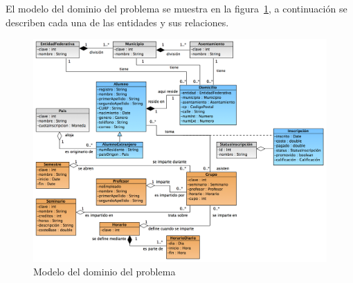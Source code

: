 
	El modelo del dominio del problema se muestra en la figura~\ref{fig:modeloDeDominio}, a continuación se describen cada una de las entidades y sus relaciones.
	
\begin{figure}[htpb!]
	\begin{center}
		\includegraphics[angle=90,width=.5\textwidth]{images/modeloDelDominioDelProblema}
		\caption{Modelo del dominio del problema}
		\label{fig:modeloDeDominio}
	\end{center}
\end{figure}

